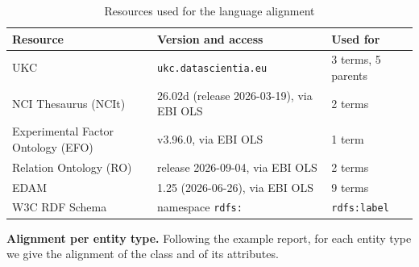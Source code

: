 \begin{table}[htbp]
\centering
\small
\begin{tabularx}{\linewidth}{|l|X|l|}
\hline
\textbf{Resource} & \textbf{Version and access} & \textbf{Used for} \\ \hline
UKC \cite{giunchiglia2017understanding} & \texttt{ukc.datascientia.eu} & 3 terms, 5 parents \\ \hline
NCI Thesaurus (NCIt) \cite{sioutos2007nci} & 26.02d (release 2026-03-19), via EBI OLS & 2 terms \\ \hline
Experimental Factor Ontology (EFO) \cite{malone2010modeling} & v3.96.0, via EBI OLS & 1 term \\ \hline
Relation Ontology (RO) \cite{smith2005relations} & release 2026-09-04, via EBI OLS & 2 terms \\ \hline
EDAM \cite{ison2013edam} & 1.25 (2026-06-26), via EBI OLS & 9 terms \\ \hline
W3C RDF Schema & namespace \texttt{rdfs:} & \texttt{rdfs:label} \\ \hline
\end{tabularx}
\caption{Resources used for the language alignment}
\label{tab:ltlo-resources}
\end{table}

\noindent\textbf{Alignment per entity type.} Following the example report, for each entity type we give the alignment of the class and of its attributes.

